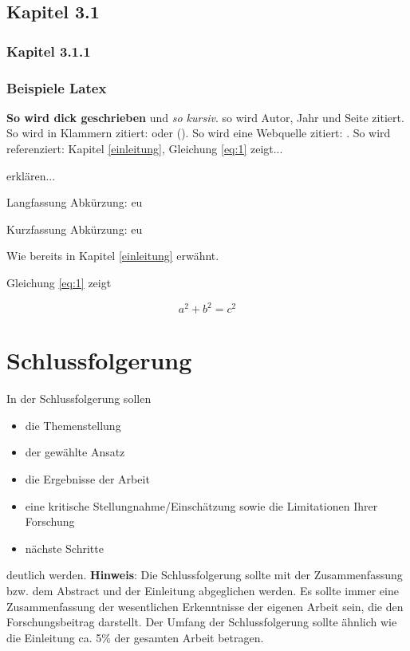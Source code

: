 \documentclass[12pt, oneside]{article}
\begin{document}
\subsection{Kapitel 3.1}

\subsubsection{Kapitel 3.1.1}

\subsubsection{Beispiele Latex}
\textbf{So wird dick geschrieben} und \textit{so kursiv}. \citet[580]{clemen1989combining} so wird Autor, Jahr und Seite zitiert. So wird in Klammern zitiert: \citep[580]{clemen1989combining} oder (\cites[580]{clemen1989combining}[548]{gilabert2006intelligent}). So wird eine Webquelle zitiert: \citet{shiny1}. So wird referenziert: Kapitel \ref{einleitung}, Gleichung \ref{eq:1} zeigt...

\citet{sun2006information} erklären...

Langfassung Abkürzung: \ac{eu}

Kurzfassung Abkürzung: \acs{eu}

Wie bereits in Kapitel \ref{einleitung} erwähnt.

Gleichung \ref{eq:1} zeigt

\begin{equation}\label{eq:1}
a^2 + b^2 = c^2
\end{equation}

\clearpage

\section{Schlussfolgerung} \label{sec:schlussfolgerung}
In der Schlussfolgerung sollen
\begin{itemize}
    \item die Themenstellung
    \item der gewählte Ansatz
    \item die Ergebnisse der Arbeit
    \item eine kritische Stellungnahme/Einschätzung sowie die Limitationen Ihrer Forschung
    \item nächste Schritte
\end{itemize}
\bigskip
deutlich werden.
\vspace{3mm}
\newline
\textbf{Hinweis}:
Die Schlussfolgerung sollte mit der Zusammenfassung bzw. dem Abstract und der Einleitung abgeglichen werden. Es sollte immer eine Zusammenfassung der wesentlichen Erkenntnisse der eigenen Arbeit sein, die den Forschungsbeitrag darstellt. Der Umfang der Schlussfolgerung sollte ähnlich wie die Einleitung ca. 5\% der gesamten Arbeit betragen.
\end{document}
